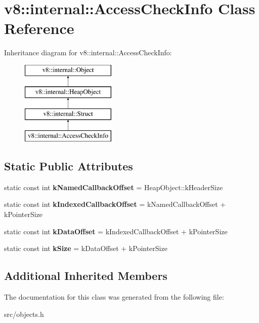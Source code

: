 \hypertarget{classv8_1_1internal_1_1_access_check_info}{}\section{v8\+:\+:internal\+:\+:Access\+Check\+Info Class Reference}
\label{classv8_1_1internal_1_1_access_check_info}
Inheritance diagram for v8\+:\+:internal\+:\+:Access\+Check\+Info\+:\begin{figure}[H]
\begin{center}
\leavevmode
\includegraphics[height=4.000000cm]{classv8_1_1internal_1_1_access_check_info}
\end{center}
\end{figure}
\subsection*{Static Public Attributes}
\begin{DoxyCompactItemize}
\item 
\hypertarget{classv8_1_1internal_1_1_access_check_info_a6cbd64c953819b14e3944340ad05e048}{}static const int {\bfseries k\+Named\+Callback\+Offset} = Heap\+Object\+::k\+Header\+Size\label{classv8_1_1internal_1_1_access_check_info_a6cbd64c953819b14e3944340ad05e048}

\item 
\hypertarget{classv8_1_1internal_1_1_access_check_info_a5bcd567490f425a95da4a3dae4e73e11}{}static const int {\bfseries k\+Indexed\+Callback\+Offset} = k\+Named\+Callback\+Offset + k\+Pointer\+Size\label{classv8_1_1internal_1_1_access_check_info_a5bcd567490f425a95da4a3dae4e73e11}

\item 
\hypertarget{classv8_1_1internal_1_1_access_check_info_a1739da947958ae7735ac674e2aac415b}{}static const int {\bfseries k\+Data\+Offset} = k\+Indexed\+Callback\+Offset + k\+Pointer\+Size\label{classv8_1_1internal_1_1_access_check_info_a1739da947958ae7735ac674e2aac415b}

\item 
\hypertarget{classv8_1_1internal_1_1_access_check_info_a30e7585ebfa4c24c214bc5a9f77ad0c3}{}static const int {\bfseries k\+Size} = k\+Data\+Offset + k\+Pointer\+Size\label{classv8_1_1internal_1_1_access_check_info_a30e7585ebfa4c24c214bc5a9f77ad0c3}

\end{DoxyCompactItemize}
\subsection*{Additional Inherited Members}


The documentation for this class was generated from the following file\+:\begin{DoxyCompactItemize}
\item 
src/objects.\+h\end{DoxyCompactItemize}
